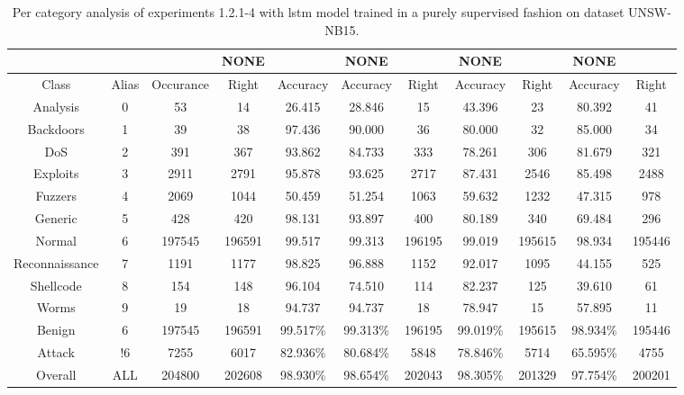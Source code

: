 \begin{table}[htb]
    \centering
    \begin{tabular}{@{}ccccccccccc@{}}
        \toprule
         &  &  & NONE &  & NONE &  & NONE &  & NONE &  \\
        \midrule
        Class &  Alias &  Occurance &  Right &  Accuracy &  Accuracy &  Right &  Accuracy &  Right &  Accuracy &  Right \\
        Analysis &  0 &  53 &  14 &  26.415 &  28.846 &  15 &  43.396 &  23 &  80.392 &  41 \\
        Backdoors &  1 &  39 &  38 &  97.436 &  90.000 &  36 &  80.000 &  32 &  85.000 &  34 \\
        DoS &  2 &  391 &  367 &  93.862 &  84.733 &  333 &  78.261 &  306 &  81.679 &  321 \\
        Exploits &  3 &  2911 &  2791 &  95.878 &  93.625 &  2717 &  87.431 &  2546 &  85.498 &  2488 \\
        Fuzzers &  4 &  2069 &  1044 &  50.459 &  51.254 &  1063 &  59.632 &  1232 &  47.315 &  978 \\
        Generic &  5 &  428 &  420 &  98.131 &  93.897 &  400 &  80.189 &  340 &  69.484 &  296 \\
        Normal &  6 &  197545 &  196591 &  99.517 &  99.313 &  196195 &  99.019 &  195615 &  98.934 &  195446 \\
        Reconnaissance &  7 &  1191 &  1177 &  98.825 &  96.888 &  1152 &  92.017 &  1095 &  44.155 &  525 \\
        Shellcode &  8 &  154 &  148 &  96.104 &  74.510 &  114 &  82.237 &  125 &  39.610 &  61 \\
        Worms &  9 &  19 &  18 &  94.737 &  94.737 &  18 &  78.947 &  15 &  57.895 &  11 \\
        Benign &  6 &  197545 &  196591 &  99.517\% &  99.313\% &  196195 &  99.019\% &  195615 &  98.934\% &  195446 \\
        Attack &  !6 &  7255 &  6017 &  82.936\% &  80.684\% &  5848 &  78.846\% &  5714 &  65.595\% &  4755 \\
        Overall &  ALL &  204800 &  202608 &  98.930\% &  98.654\% &  202043 &  98.305\% &  201329 &  97.754\% &  200201 \\
        \bottomrule
    \end{tabular}
    \caption{Per category analysis of experiments 1.2.1-4 with \gls{lstm} model trained in a purely supervised fashion on dataset UNSW-NB15.}
    \label{table:results:lstm:class_flows15_supervised}
\end{table}
